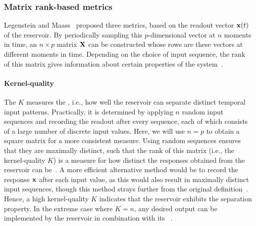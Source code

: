 \subsubsection{Matrix rank-based metrics} \label{sec:1:RC_metrics_KQ}
Legenstein and Maass~\cite{WhatMakesPowerful} proposed three metrics, based on the readout vector $\boldsymbol{\mathbf{x}}(t)$ of the reservoir.
By periodically sampling this $p$-dimensional vector at $n$ moments in time, an $n \times p$ matrix $\boldsymbol{\mathbf{X}}$ can be constructed whose rows are these vectors at different moments in time.
Depending on the choice of input sequence, the rank of this matrix gives information about certain properties of the system~\cite{RC_ASI}.

\paragraph{Kernel-quality}
The  $K$ measures the , i.e., how well the reservoir can separate distinct temporal input patterns.
Practically, it is determined by applying $n$ random input sequences and recording the readout after every sequence, each of which consists of a large number of discrete input values.
Here, we will use $n=p$ to obtain a square matrix for a more consistent measure.
Using random sequences ensures that they are maximally distinct, such that the rank of this matrix (i.e., the kernel-quality $K$) is a measure for how distinct the responses obtained from the reservoir can be~\cite{Vidamour_2022}.
A more efficient alternative method would be to record the response $\boldsymbol{\mathbf{x}}$ after each input value, as this would also result in maximally distinct input sequences, though this method strays further from the original definition~\cite{RC_HierarchicalNeuroevolution,RCbenchmarksReview1}.
Hence, a high kernel-quality $K$ indicates that the reservoir exhibits the separation property.
In the extreme case where $K=n$, any desired output can be implemented by the reservoir in combination with its ~\cite{WhatMakesPowerful}.

